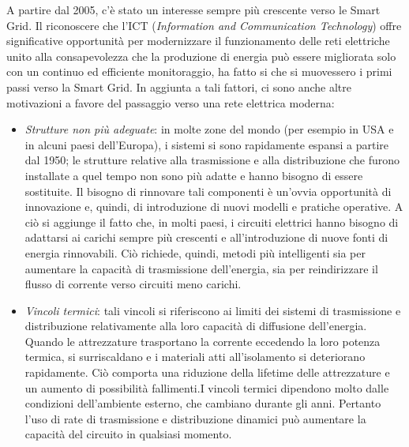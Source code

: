 A partire dal 2005, c'è stato un interesse sempre più crescente verso le Smart Grid. Il riconoscere che l'ICT (\textit{Information and Communication Technology}) offre significative opportunità per modernizzare il funzionamento delle reti elettriche unito alla consapevolezza che la produzione di energia può essere migliorata solo con un continuo ed efficiente monitoraggio, ha fatto si che si muovessero i primi passi verso la Smart Grid. In aggiunta a tali fattori, ci sono anche altre motivazioni a favore del passaggio verso una rete elettrica moderna:
\begin{itemize}
\item \textit{Strutture non più adeguate}: in molte zone del mondo (per esempio in USA e in alcuni paesi dell'Europa), i sistemi si sono rapidamente espansi a partire dal 1950; le strutture relative alla trasmissione e alla distribuzione che furono installate a quel tempo non sono più adatte e hanno bisogno di essere sostituite. \newline Il bisogno di rinnovare tali componenti è un'ovvia opportunità di innovazione e, quindi, di introduzione di nuovi modelli e pratiche operative. \newline A ciò si aggiunge il fatto che, in molti paesi, i circuiti elettrici hanno bisogno di adattarsi ai carichi sempre più crescenti e all'introduzione di nuove fonti di energia rinnovabili. Ciò richiede, quindi, metodi più intelligenti sia per aumentare la capacità di trasmissione dell'energia, sia per reindirizzare il flusso di corrente verso circuiti meno carichi.

\item \textit{Vincoli termici}: tali vincoli si riferiscono ai limiti dei sistemi di trasmissione e distribuzione relativamente alla loro capacità di diffusione dell'energia. Quando le attrezzature trasportano la corrente eccedendo la loro potenza termica, si surriscaldano e i materiali atti all'isolamento si deteriorano rapidamente. Ciò comporta una riduzione della lifetime delle attrezzature e un aumento di possibilità fallimenti.\newline I vincoli termici dipendono molto dalle condizioni dell'ambiente esterno, che cambiano durante gli anni. Pertanto l'uso di rate di trasmissione e distribuzione dinamici può aumentare la capacità del circuito in qualsiasi momento.


\end{itemize}
